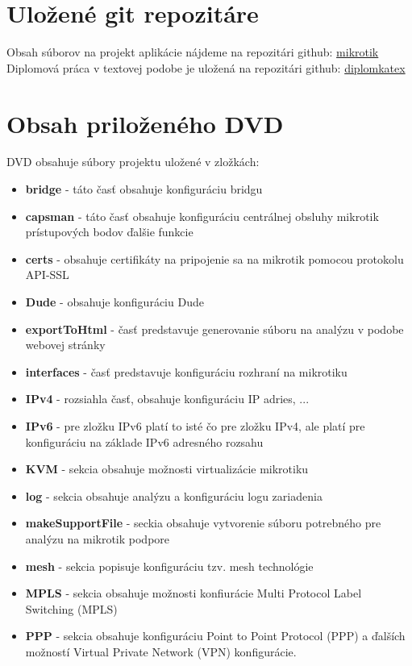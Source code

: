 \section{Uložené git repozitáre}
Obsah súborov na projekt aplikácie nájdeme na repozitári github: \href{//github.com/adiosko/mikrotik/tree/adrian}{mikrotik}\\
Diplomová práca v textovej podobe je uložená na repozitári github: \href{https://github.com/adiosko/tex_diplomka_mikrotik/tree/adrian}{diplomkatex}
\section{Obsah priloženého DVD}
DVD obsahuje súbory projektu uložené v zložkách:
\begin{itemize}
\item \textbf{bridge} - táto časť obsahuje konfiguráciu bridgu
\item  \textbf{capsman} - táto časť obsahuje konfiguráciu centrálnej obsluhy mikrotik prístupových bodov  ďalšie funkcie
\item \textbf{certs} - obsahuje certifikáty na pripojenie sa na mikrotik pomocou protokolu API-SSL
\item \textbf{Dude} - obsahuje konfiguráciu Dude
\item \textbf{exportToHtml} - časť predstavuje generovanie súboru na analýzu v podobe webovej stránky
\item \textbf{interfaces} - časť predstavuje konfiguráciu rozhraní na mikrotiku
\item \textbf{IPv4} - rozsiahla časť, obsahuje konfiguráciu IP adries, ...
\item \textbf{IPv6} - pre zložku IPv6 platí to isté čo pre zložku IPv4, ale platí pre konfiguráciu na základe IPv6 adresného rozsahu
\item \textbf{KVM} - sekcia obsahuje možnosti virtualizácie mikrotiku
\item \textbf{log} - sekcia obsahuje analýzu a konfiguráciu logu zariadenia
\item \textbf{makeSupportFile} - seckia obsahuje vytvorenie súboru potrebného pre analýzu na mikrotik podpore
\item \textbf{mesh} - sekcia popisuje konfiguráciu tzv. mesh technológie
\item \textbf{MPLS} - sekcia obsahuje možnosti konfiurácie Multi Protocol Label Switching (MPLS)
\item \textbf{PPP} - sekcia obsahuje konfiguráciu Point to Point Protocol (PPP) a ďalších možností Virtual Private Network (VPN) konfigurácie.

\end{itemize}
